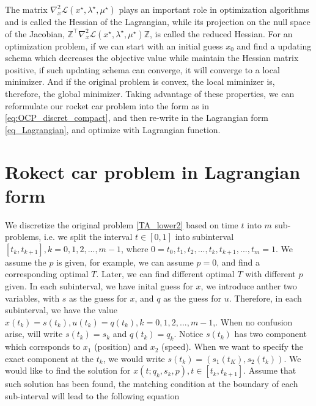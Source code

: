 \documentclass  [
  paper    = a4,
  BCOR     = 10mm,
  twoside,
  fontsize = 12pt,
  fleqn,
  toc      = bibnumbered,
  toc      = listofnumbered,
  numbers  = noendperiod,
  headings = normal,
  listof   = leveldown,
  version  = 3.03
]                                       {scrreprt}
\newcommand{\<}{\langle}
\renewcommand{\>}{\rangle}
\begin{document}
The matrix $\nabla_x^2 \mathcal{L}(x^\star, \lambda^\star, \mu^\star)$ plays an important role in optimization algorithms and is called the Hessian of the Lagrangian, while its projection on the null space of the Jacobian, $\mathbb{Z}^\top \nabla_x^2 \mathcal{L}(x^\star, \lambda^\star, \mu^\star)\mathbb{Z}$, is called the reduced
Hessian. For an optimization problem, if we can start with an initial guess $x_0$ and find a updating schema which decreases the objective value while maintain the Hessian matrix positive, if such updating schema can converge, it will converge to a local minimizer. And if the original problem is convex, the local miminizer is, therefore, the global minimizer. Taking advantage of these properties, we can reformulate our rocket car problem into the form as in \ref{eq:OCP_discret_compact}, and then re-write in the Lagrangian form \ref{eq_Lagrangian}, and optimize with Lagrangian function. 

\section{Rokect car problem in Lagrangian form}

We discretize the original problem \ref{TA_lower2} based on time $t$ into $m$ sub-problems, i.e. we split the interval $t\in [0,1]$ into subinterval $[t_{k}, t_{k+1}], k = 0, 1, 2, ..., m-1$, where $0 = t_0, t_1, t_2, ...,t_k, t_{k+1}, ..., t_m = 1$. We assume the $p$ is given, for example, we can assume $p=0$, and find a corresponding optimal $T$. Later, we can find different optimal $T$ with different $p$ given. In each subinterval, we have inital guess for $x$, we introduce anther two variables, with $s$ as the guess for $x$, and $q$ as the guess for $u$. Therefore, in each subinterval, we have the value $ x(t_k) = s(t_k), u(t_k) = q(t_k),  k = 0, 1, 2, ..., m-1$,. When no confusion arise, will write $s(t_k) = s_k $ and $q(t_k) = q_k$. Notice $s(t_k)$ has two component which corrsponds to $x_1$ (position) and $x_2$ (speed). When we want to specify the exact component at the $t_k$, we would write $s(t_k) = (s_1(t_K), s_2(t_k))$. We would like to find the solution for $x(t; q_k, s_k, p),  t  \in [t_{k}, t_{k+1}]$. Assume that such solution has been found, the matching condition at the boundary of each sub-interval will lead to the following equation
\end{document}
